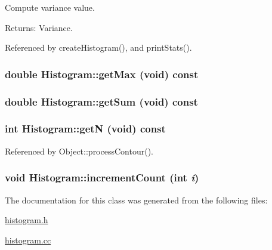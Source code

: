 Compute variance value. \begin{Desc}
\item[Returns:]Variance. \end{Desc}


Referenced by createHistogram(), and printStats().\hypertarget{classHistogram_3ca1a2615022ea79e5416e9f0b0cf3ff}{
\subsubsection[getMax]{\setlength{\rightskip}{0pt plus 5cm}double Histogram::getMax (void) const}}
\label{classHistogram_3ca1a2615022ea79e5416e9f0b0cf3ff}


\hypertarget{classHistogram_751589c1e984897e7bacccbc86f04e13}{
\subsubsection[getSum]{\setlength{\rightskip}{0pt plus 5cm}double Histogram::getSum (void) const}}
\label{classHistogram_751589c1e984897e7bacccbc86f04e13}


\hypertarget{classHistogram_e9bdc4c640381ca1babc8005b1a4005b}{
\subsubsection[getN]{\setlength{\rightskip}{0pt plus 5cm}int Histogram::getN (void) const}}
\label{classHistogram_e9bdc4c640381ca1babc8005b1a4005b}




Referenced by Object::processContour().\hypertarget{classHistogram_b09f206e1a16868d2d689853d2bd1209}{
\subsubsection[incrementCount]{\setlength{\rightskip}{0pt plus 5cm}void Histogram::incrementCount (int {\em i})}}
\label{classHistogram_b09f206e1a16868d2d689853d2bd1209}




The documentation for this class was generated from the following files:\begin{CompactItemize}
\item 
\hyperlink{histogram_8h}{histogram.h}\item 
\hyperlink{histogram_8cc}{histogram.cc}\end{CompactItemize}
